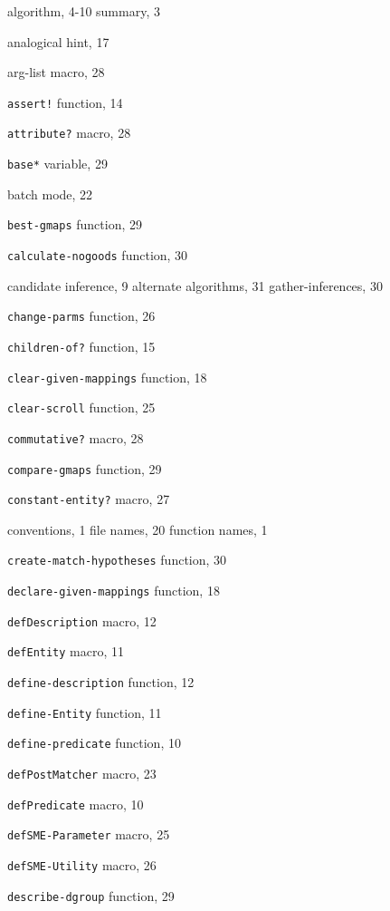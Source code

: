 \newpage
{}

\begin{theindex}

\item algorithm, 4-10
	\subitem  summary, 3
\item analogical hint, 17
\item arg-list macro, 28
\item {\tt assert!} function, 14
\item {\tt attribute?} macro, 28
\indexspace
\item {\tt *base*} variable, 29
\item batch mode, 22
\item {\tt best-gmaps} function, 29
\indexspace
\item {\tt calculate-nogoods} function, 30
\item candidate inference, 9
	\subitem  alternate algorithms, 31
	\subitem  gather-inferences, 30
\item {\tt change-parms} function, 26
\item {\tt children-of?} function, 15
\item {\tt clear-given-mappings} function, 18
\item {\tt clear-scroll} function, 25
\item {\tt commutative?} macro, 28
\item {\tt compare-gmaps} function, 29
\item {\tt constant-entity?} macro, 27
\item conventions, 1
	\subitem  file names, 20
	\subitem  function names, 1
\item {\tt create-match-hypotheses} function, 30
\indexspace
\item {\tt declare-given-mappings} function, 18
\item {\tt defDescription} macro, 12
\item {\tt defEntity} macro, 11
\item {\tt define-description} function, 12
\item {\tt define-Entity} function, 11
\item {\tt define-predicate} function, 10
\item {\tt defPostMatcher} macro, 23
\item {\tt defPredicate} macro, 10
\item {\tt defSME-Parameter} macro, 25
\item {\tt defSME-Utility} macro, 26
\item {\tt describe-dgroup} function, 29

\end{theindex}
